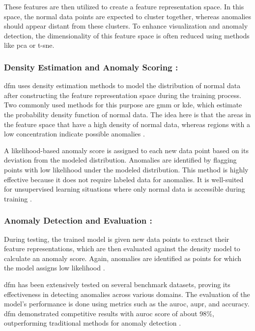 These features are then utilized to create a feature representation space. In this space, the normal data points are expected to cluster together, whereas anomalies should appear distant from these clusters. To enhance visualization and anomaly detection\cite{ahuja2019probabilisticmodelingdeepfeatures}, the dimensionality of this feature space is often reduced using methods like \gls{pca}\cite{Bishop2006} or \gls{t-sne}\cite{JMLR:v9:vandermaaten08a}.

\subsubsection*{Density Estimation and Anomaly Scoring :}

\gls{dfm} uses density estimation methods to model the distribution of normal data after constructing the feature representation space during the training process. Two commonly used methods for this purpose are \gls{gmm} or \gls{kde}, which estimate the probability density function of normal data. The idea here is that the areas in the feature space that have a high density of normal data, whereas regions with a low concentration indicate possible anomalies \cite{ahuja2019probabilisticmodelingdeepfeatures}.

A likelihood-based anomaly score is assigned to each new data point based on its deviation from the modeled distribution. Anomalies are identified by flagging points with low likelihood under the modeled distribution. This method is highly effective because it does not require labeled data for anomalies. It is well-suited for unsupervised learning situations where only normal data is accessible during training \cite{ahuja2019probabilisticmodelingdeepfeatures}.

\subsubsection*{Anomaly Detection and Evaluation :}

During testing, the trained model is given new data points to extract their feature representations, which are then evaluated against the density model to calculate an anomaly score. Again, anomalies are identified as points for which the model assigns low likelihood \cite{ahuja2019probabilisticmodelingdeepfeatures}.

\gls{dfm} has been extensively tested on several benchmark datasets, proving its effectiveness in detecting anomalies across various domains. The evaluation of the model's performance is done using metrics such as the \gls{auroc}, \gls{aupr}, and accuracy. \gls{dfm} demonstrated competitive results with \gls{auroc} score of about 98\%, outperforming traditional methods for anomaly detection \cite{ahuja2019probabilisticmodelingdeepfeatures}.

